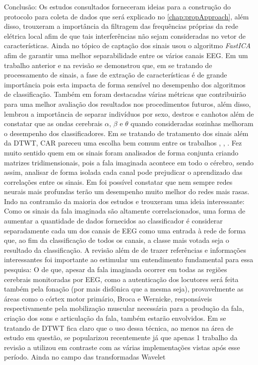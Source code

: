 			\par Conclusão: Os estudos consultados forneceram ideias para a construção do protocolo para coleta de dados que será explicado no \autoref{chap:propApproach}, além disso, trouxeram a importância da filtragem das frequências próprias da rede elétrica local \cite{MahapatraNrushinghCharan2023Ecoi} afim de que tais interferências não sejam consideradas no vetor de características. Ainda no tópico de captação dos sinais \cite{MahapatraNrushinghCharan2022MCoI} usou o algoritmo \textit{FastICA} afim de garantir uma melhor separabilidade entre os vários canais EEG. Em um trabalho anterior \cite{furlan2021caracterizacao} e na revisão \cite{ShahUzair2022TRoA} se demonstrou que, em se tratando de processamento de sinais, a fase de extração de características é de grande importância pois esta impacta de forma sensível no desempenho dos algoritmos de classificação. Também em \cite{ShahUzair2022TRoA} foram destacadas várias métricas que contribuirão para uma melhor avaliação dos resultados nos procedimentos futuros, além disso, \cite{AgarwalPrabhakar2022Ebia} lembrou a importância de separar indivíduos por sexo, destros e canhotos além de constatar que as ondas cerebrais $\alpha$, $\beta$ e $\theta$ quando consideradas sozinhas melhoram o desempenho dos classificadores. Em se tratando de tratamento dos sinais além da DTWT, CAR pareceu uma escolha bem comum entre os trabalhos \cite{AgarwalPrabhakar2022Ebia}, \cite{Hernandez-Del-ToroTonatiuh2021TaEB}, \cite{MOCTEZUMA2019201}. Fez muito sentido quem em \cite{PanachakelJerrinRamakrishnan} os sinais foram analisados de forma conjunta criando matrizes tridimensionais, pois a fala imaginada acontece em todo o cérebro, sendo assim, analisar de forma isolada cada canal pode prejudicar o aprendizado das correlações entre os sinais. Em \cite{tamm2020classification} foi possível constatar que nem sempre redes neurais mais profundas terão um desempenho muito melhor do redes mais rasas. Indo na contramão da maioria dos estudos \cite{Panachakel_2019} e \cite{panachakel2020novel} trouxeram uma ideia interessante: Como os sinais da fala imaginada são altamente correlacionados, uma forma de aumentar a quantidade de dados fornecidos ao classificador é considerar separadamente cada um dos canais de EEG como uma entrada à rede de forma que, ao fim da classificação de todos os canais, a classe mais votada seja o resultado da classificação. A revisão \cite{s23125575} além de de trazer referências e informações interessantes foi importante ao estimular um entendimento fundamental para essa pesquisa: O de que, apesar da fala imaginada ocorrer em todas as regiões cerebrais monitoradas por EEG, como a autenticação dos locutores será feita também pela fonação (por mais disfônica que a mesma seja), provavelmente as áreas como o córtex motor primário, Broca e Wernicke, responsáveis respectivamente pela mobilização muscular necessária para a produção da fala, criação dos sons e articulação da fala, também estarão envolvidos. Em se tratando de DTWT fica claro que o uso dessa técnica, ao menos na área de estudo em questão, se popularizou recentemente já que apenas 1 trabalho da revisão a utilizou em contraste com as várias implementações vistas após esse período. Ainda no campo das transformadas Wavelet 